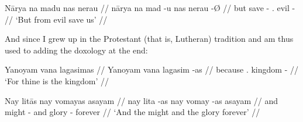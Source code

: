 \documentclass[12pt,paper=a4]{scrartcl}
\begin{document}
\ex %
\begingl
    \glpreamble Nārya na madu nas nerau //
    \gla nārya na mad -u nas nerau -Ø //
    \glb but \GenT{} save -\Imp{} \Fpl{}.\Parg{} evil -\Top{} //
    \glft `But from evil save us' //
\endgl
\xe

\noindent And since I grew up in the Protestant (that is, Lutheran) tradition 
and am thus used to adding the doxology at the end:

\ex %
\begingl
    \glpreamble Yanoyam vana lagasimas //
    \gla Yanoyam vana lagasim -as //
    \glb because \Ssg{}.\Gen{} kingdom -\Parg{} //
    \glft `For thine is the kingdom' //
\endgl
\xe

\ex %
\begingl
    \glpreamble Nay litās nay vomayas asayam //
    \gla nay lita -as nay vomay -as asayam //
    \glb and might -\Parg{} and glory -\Parg{} forever //
    \glft `And the might and the glory forever' //
\endgl
\xe


\begin{multicols}{3}
\printglossary[style=mysuper,type=\leipzigtype]
\end{multicols}

\printbibliography
\end{document}
